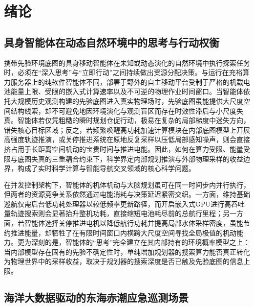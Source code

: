 \section{绪论}

\subsection{具身智能体在动态自然环境中的思考与行动权衡}

携带先验环境底图的具身移动智能体在未知或动态演化的自然环境中执行探索任务时，必须在“深入思考”与“立即行动”之间持续做出资源分配决策\cite{horvitz1987reasoning, russell1991right, shen2025thinking}。与运行在充裕算力服务器上的纯软件智能体不同，部署于野外的自主移动平台受制于严格的机载电池能量上限、受限的嵌入式计算速率以及不可逆的物理作业时间窗口\cite{xiao2020thinking, magnino2026metareasoning}。当智能体依托大规模历史观测构建的先验底图进入真实物理场时，先验底图虽能提供大尺度空间结构线索，却不可避免地因环境演化与观测盲区而存在时效性滞后与小尺度失真\cite{jiang2015horizon}。智能体若仅凭粗糙的瞬时规划仓促行动，极易在复杂的局部梯度中迷失方向，错失核心目标区域；反之，若频繁唤醒高功耗加速计算模块在内部底图模型上开展高强度轨迹推演，或关停推进系统在原地反复采样以压低局部感知噪声，则会直接挤占用于长距离空间机动的宝贵时间与推进电能\cite{cuadron2025overthinking, elboher2023formal}。因此，如何在算力受限、能量受限与底图失真的三重耦合约束下，科学界定内部规划推演与外部物理采样的收益边界，构成了实时科学计算与智能导航交叉领域的核心科学问题\cite{hunt2021formalizing}。

在并发控制架构下，智能体的机体机动与大脑规划虽可在同一时间步内并行执行，但两者的资源竞争关系依然通过电能消耗与决策延迟紧密交织\cite{xiao2020thinking, elboher2023formal}。一方面，维持基础巡航仅需后台低功耗处理器以较低频率更新路径，而开启嵌入式GPU进行高吞吐量轨迹搜索则会显著抬升整机功耗，直接缩短电池耗尽前的总航行里程；另一方面，若智能体选择关停推进电机以降低航行功耗并提高局部水体采样密度，虽能节约推进能量，却牺牲了在有限时间窗口内横跨大尺度空间寻找全局极值的机动能力。更为深刻的是，智能体的“思考”完全建立在其内部持有的环境概率模型之上：当内部模型存在固有的先验不确定性时，单纯增加规划器的搜索算力能否真正转化为物理世界中的采样收益，取决于规划器的搜索深度是否已触及先验底图的信息上限\cite{jiang2015horizon, smith2006curse}。

\subsection{海洋大数据驱动的东海赤潮应急巡测场景}

